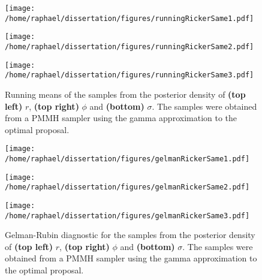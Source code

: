 \documentclass[12pt]{article}
\begin{document}
	\begin{figure}[htb]
		\centering
		\begin{minipage}{0.4\textwidth}
			\centering
			\texttt{[image: /home/raphael/dissertation/figures/runningRickerSame1.pdf]}
		\end{minipage}
		\begin{minipage}{0.4\textwidth}
			\centering
			\texttt{[image: /home/raphael/dissertation/figures/runningRickerSame2.pdf]}
		\end{minipage}
		\begin{minipage}{0.4\textwidth}
			\centering
			\texttt{[image: /home/raphael/dissertation/figures/runningRickerSame3.pdf]}
		\end{minipage}
		\caption[Running means of a run of a PMMH sampler on data simulated from the Ricker model]{Running means of the samples from the posterior density of \textbf{(top left)} $r$, \textbf{(top right)} $\phi$ and \textbf{(bottom)} $\sigma$. The samples were obtained from a PMMH sampler using the gamma approximation to the optimal proposal.}
		\label{fig:rmDiag}
	\end{figure}

\clearpage
	\begin{figure}[htb]
		\centering
		\begin{minipage}{0.4\textwidth}
			\centering
			\texttt{[image: /home/raphael/dissertation/figures/gelmanRickerSame1.pdf]}
		\end{minipage}
		\begin{minipage}{0.4\textwidth}
			\centering
			\texttt{[image: /home/raphael/dissertation/figures/gelmanRickerSame2.pdf]}
		\end{minipage}
		\begin{minipage}{0.4\textwidth}
			\centering
			\texttt{[image: /home/raphael/dissertation/figures/gelmanRickerSame3.pdf]}
		\end{minipage}
		\caption[Gelman-Rubin diagnostic of the chains of a PMMH sampler on data simulated from the Ricker model]{Gelman-Rubin diagnostic for the samples from the posterior density of \textbf{(top left)} $r$, \textbf{(top right)} $\phi$ and \textbf{(bottom)} $\sigma$. The samples were obtained from a PMMH sampler using the gamma approximation to the optimal proposal.}
		\label{fig:gelmanDiag}
	\end{figure}
	
\end{document}
